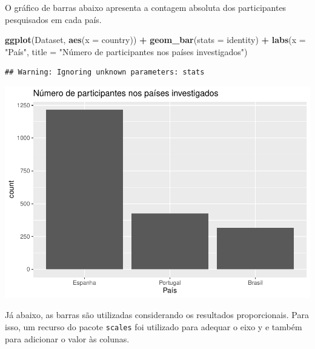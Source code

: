 \documentclass[
]{book}
\newenvironment{Shaded}{\begin{snugshade}}{\end{snugshade}}
\newcommand{\DataTypeTok}[1]{\textcolor[rgb]{0.13,0.29,0.53}{#1}}
\newcommand{\KeywordTok}[1]{\textcolor[rgb]{0.13,0.29,0.53}{\textbf{#1}}}
\newcommand{\NormalTok}[1]{#1}
\newcommand{\OperatorTok}[1]{\textcolor[rgb]{0.81,0.36,0.00}{\textbf{#1}}}
\newcommand{\StringTok}[1]{\textcolor[rgb]{0.31,0.60,0.02}{#1}}
\begin{document}
O gráfico de barras abaixo apresenta a contagem absoluta dos participantes pesquisados em cada país.

\begin{Shaded}
\begin{Highlighting}[]
\KeywordTok{ggplot}\NormalTok{(Dataset, }\KeywordTok{aes}\NormalTok{(}\DataTypeTok{x =}\NormalTok{ country)) }\OperatorTok{+}
\StringTok{  }\KeywordTok{geom_bar}\NormalTok{(}\DataTypeTok{stats =}\NormalTok{ identity) }\OperatorTok{+}
\StringTok{  }\KeywordTok{labs}\NormalTok{(}\DataTypeTok{x =} \StringTok{"País"}\NormalTok{, }\DataTypeTok{title =} \StringTok{"Número de participantes nos países investigados"}\NormalTok{)}
\end{Highlighting}
\end{Shaded}

\begin{verbatim}
## Warning: Ignoring unknown parameters: stats
\end{verbatim}

\begin{center}\includegraphics{gitbook-demo_files/figure-latex/unnamed-chunk-13-1} \end{center}

Já abaixo, as barras são utilizadas considerando os resultados proporcionais. Para isso, um recurso do pacote \texttt{scales} foi utilizado para adequar o eixo y e também para adicionar o valor às colunas.
\end{document}
